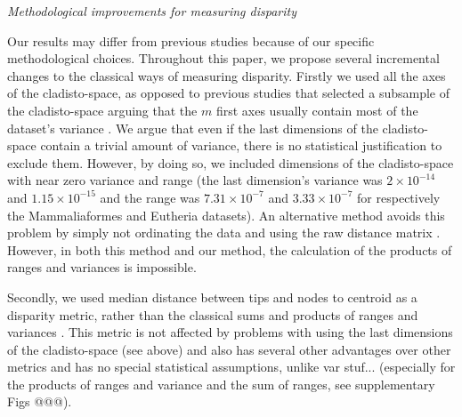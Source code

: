 \documentclass[12pt,letterpaper]{article}
\renewcommand{\subsection}[1]{%
\bigskip
\begin{center}
\begin{large}
\normalfont\itshape #1
\end{large}
\end{center}}
\begin{document}
\subsection{Methodological improvements for measuring disparity}
Our results may differ from previous studies because of our specific methodological choices.
Throughout this paper, we propose several incremental changes to the classical ways of measuring disparity.
Firstly we used all the axes of the cladisto-space, as opposed to previous studies that selected a subsample of the cladisto-space arguing that the $m$ first axes usually contain most of the dataset's variance \citep[e.g][]{brusatte50,cisneros2010,prentice2011,anderson2012using,Hughes20082013,bentonmodels2014}.
We argue that even if the last dimensions of the cladisto-space contain a trivial amount of variance, there is no statistical justification to exclude them.
However, by doing so, we included dimensions of the cladisto-space with near zero variance and range (the last dimension's variance was $2\times10^{-14}$ and $1.15\times10^{-15}$ and the range was $7.31\times10^{-7}$ and $3.33\times10^{-7}$ for respectively the Mammaliaformes and Eutheria datasets). %
%
%
An alternative method avoids this problem by simply not ordinating the data and using the raw distance matrix \citep[e.g.][]{bensonfaunal2014,Close2015}. 
However, in both this method and our method, the calculation of the products of ranges and variances is impossible.

Secondly, we used median distance between tips and nodes to centroid as a disparity metric, rather than the classical sums and products of ranges and variances \citep{Wills1994}.
This metric is not affected by problems with using the last dimensions of the cladisto-space (see above) and also has several other advantages over other metrics and has no special statistical assumptions, unlike var stuf... %
(especially for the products of ranges and variance and the sum of ranges, see supplementary Figs @@@).
%
%
\end{document}
